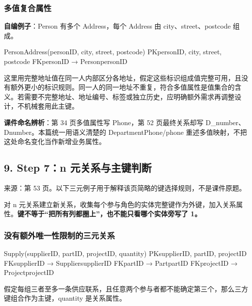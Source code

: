 \subsubsection{多值复合属性}\label{04_er_to_relational_mapping_zh-ux591aux503cux590dux5408ux5c5eux6027}

\textbf{自编例子}：Person 有多个 Address，每个 Address 由 city、street、postcode 组成。

\begin{StudyCode}
PersonAddress(personID, city, street, postcode)
PK{personID, city, street, postcode}
FK{personID} → Person{personID}
\end{StudyCode}

这里用完整地址值在同一人内部区分各地址，假定这些标识组成值完整可用，且没有额外更小的标识规则。同一人的同一地址不重复，符合多值属性是值集合的含义。若需要不完整地址、地址编号、标签或独立历史，应明确额外需求再调整设计，不机械套用此主键。

\textbf{课件命名辨析}：第 34 页多值属性写 Phone，第 52 页最终关系却写 D\_number、Dnumber。本篇统一用语义清楚的 DepartmentPhone/phone 重述多值映射，不把这处命名变化当作新增业务属性。

\subsection{9. Step 7：n 元关系与主键判断}\label{04_er_to_relational_mapping_zh-step-7n-ux5143ux5173ux7cfbux4e0eux4e3bux952eux5224ux65ad}

来源：第 53 页。以下三元例子用于解释该页简略的键选择规则，不是课件原题。

对 n 元关系建立新关系，收集每个参与角色的实体完整键作为外键，加入关系属性。\textbf{键不等于``把所有列都圈上''，也不能只看哪个实体旁写了 1。}

\subsubsection{没有额外唯一性限制的三元关系}\label{04_er_to_relational_mapping_zh-ux6ca1ux6709ux989dux5916ux552fux4e00ux6027ux9650ux5236ux7684ux4e09ux5143ux5173ux7cfb}

\begin{StudyCode}
Supply(supplierID, partID, projectID, quantity)
PK{supplierID, partID, projectID}
FK{supplierID} → Supplier{supplierID}
FK{partID} → Part{partID}
FK{projectID} → Project{projectID}
\end{StudyCode}

假定每组三者至多一条供应联系，且任意两个参与者都不能确定第三个，那么三方键组合作为主键，quantity 是关系属性。

